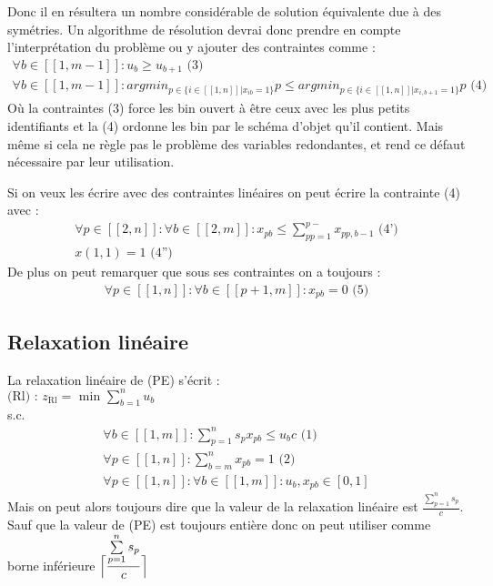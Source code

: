 \documentclass{article}
\begin{document}
Donc il en résultera un nombre considérable de solution équivalente due à des symétries. Un algorithme de résolution devrai donc prendre en compte l’interprétation du problème ou y ajouter des contraintes comme :
\begin{align*}
 \forall b \in [\![ 1 , m-1 ]\!] : u_b \geqslant u_{b+1} \text{ (3)}\\
 \forall b \in [\![ 1 , m-1 ]\!] : argmin_{ p \in \{ i \in [\![ 1 , n ]\!] | x_{ib} = 1 \} } p \leqslant argmin_{ p \in \{ i \in [\![ 1 , n ]\!] | x_{i,b+1} = 1 \} } p \text{ (4)}
\end{align*}
Où la contraintes (3) force les bin ouvert à être ceux avec les plus petits identifiants et la (4) ordonne les bin par le schéma d'objet qu'il contient. Mais même si cela ne règle pas le problème des variables redondantes, et rend ce défaut nécessaire par leur utilisation.

Si on veux les écrire avec des contraintes linéaires on peut écrire la contrainte (4) avec :
\begin{align*}
 \forall p \in [\![ 2 , n ]\!] : \forall b \in [\![ 2 , m ]\!] : x_{pb} \leqslant \sum \limits_{pp = 1}^{p-} x_{pp,b-1} \text{ (4')}\\
 x(1,1) = 1 \text{ (4'')}
\end{align*}
De plus on peut remarquer que sous ses contraintes on a toujours :
\begin{align*}
 \forall p \in [\![ 1 , n ]\!] : \forall b \in [\![ p+1 , m ]\!] : x_{pb} = 0 \text{ (5)}
\end{align*}
\subsection{Relaxation linéaire}

La relaxation linéaire de (PE) s'écrit :\\
$\text{(Rl) : } z_{\text{Rl}} = \text{ min } \sum \limits_{b = 1 }^{n} u_b$\\
s.c.
\begin{align*}
 \forall b \in [\![ 1 , m ]\!] : \sum \limits_{p = 1}^{n} s_p x_{pb} \leqslant u_b c \text{ (1)}\\
 \forall p \in [\![ 1 , n ]\!] : \sum \limits_{b = m}^{n} x_{pb} = 1 \text{ (2)} \\
 \forall p \in [\![ 1 , n ]\!] : \forall b \in [\![ 1 , m ]\!] : u_b , x_{pb} \in [0,1]
\end{align*}
Mais on peut alors toujours dire que la valeur de la relaxation linéaire est $\frac{\sum \limits_{p = 1}^n s_p}{c}$. Sauf que la valeur de (PE) est toujours entière donc on peut utiliser comme borne inférieure $\Bigl\lceil\dfrac{\sum \limits_{p = 1}^n s_p}{c}\Bigr\rceil\qquad$
\end{document}
